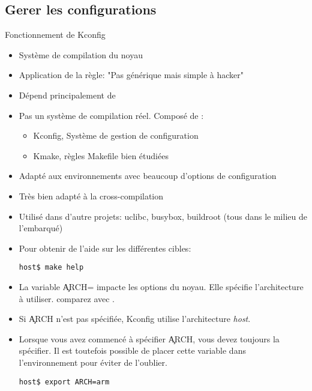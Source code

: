 \subsection{Gerer les configurations}
\begin{frame}[fragile=singleslide]{Fonctionnement de Kconfig}
  \begin{itemize}
  \item Système de compilation du noyau
  \item Application de la règle: "Pas générique mais simple à hacker"
  \item Dépend principalement de 
  \item  Pas un  système de  compilation réel. Composé de :
    \begin{itemize}
    \item Kconfig, Système de gestion de configuration
    \item Kmake, règles Makefile bien étudiées
    \end{itemize}
  \item   Adapté  aux  environnements   avec  beaucoup   d'options  de
    configuration
  \item Très bien adapté à la cross-compilation
  \item Utilisé dans d'autre projets: uclibc, busybox, buildroot (tous
    dans le milieu de l'embarqué)
  \item Pour obtenir de l'aide sur les différentes cibles:
    \begin{lstlisting}
host$ make help
    \end{lstlisting} 
  \item  La variable  \c{ARCH=}  impacte les  options  du noyau.  Elle
    spécifie l'architecture à utiliser.  comparez  avec
    . 
  \item   Si   \c{ARCH}   n'est   pas   spécifiée,   Kconfig   utilise
    l'architecture \emph{host}.
  \item Lorsque  vous avez commencé  à spécifier \c{ARCH},  vous devez
    toujours la  spécifier. Il est toutefois possible  de placer cette
    variable dans l'environnement pour éviter de l'oublier.
    \begin{lstlisting}
host$ export ARCH=arm 
    \end{lstlisting} 
  \end{itemize} 
\end{frame} 

